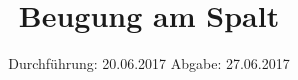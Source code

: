 


\subject{V406}
\title{\texorpdfstring{Beugung am Spalt}{}}
\date{
	Durchführung: 20.06.2017
	\hspace{4em}
	Abgabe: 27.06.2017
}


	\maketitle
	\newpage
	\tableofcontents
	\newpage
	
	
	
	
	
	
	\newpage

	\printbibliography

